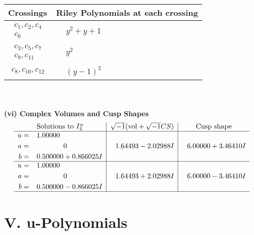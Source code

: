 \documentclass[1p]{elsarticle_modified}
\theoremstyle{definition}
\newcommand{\I}{\sqrt{-1}}
\begin{document}
\begin{tabular}{m{50pt}|m{274pt}}
Crossings & \hspace{64pt}Riley Polynomials at each crossing \\
\hline $$\begin{aligned}c_{1},c_{2},c_{4}\\c_{6}\end{aligned}$$&$\begin{aligned}
&y^2+y+1
\end{aligned}$\\
\hline $$\begin{aligned}c_{3},c_{5},c_{7}\\c_{9},c_{11}\end{aligned}$$&$\begin{aligned}
&y^2
\end{aligned}$\\
\hline $$\begin{aligned}c_{8},c_{10},c_{12}\end{aligned}$$&$\begin{aligned}
&(y-1)^2
\end{aligned}$\\
\hline
\end{tabular}\\~\\
\newpage\flushleft \textbf{(vi) Complex Volumes and Cusp Shapes}
$$\begin{array}{c|c|c}  
\text{Solutions to }I^u_{4}& \I (\text{vol} + \sqrt{-1}CS) & \text{Cusp shape}\\
 \hline 
\begin{aligned}
u &= \phantom{-}1.00000\phantom{ +0.000000I} \\
a &= \phantom{-0.000000 } 0 \\
b &= \phantom{-}0.500000 + 0.866025 I\end{aligned}
 & \phantom{-}1.64493 - 2.02988 I & \phantom{-}6.00000 + 3.46410 I \\ \hline\begin{aligned}
u &= \phantom{-}1.00000\phantom{ +0.000000I} \\
a &= \phantom{-0.000000 } 0 \\
b &= \phantom{-}0.500000 - 0.866025 I\end{aligned}
 & \phantom{-}1.64493 + 2.02988 I & \phantom{-}6.00000 - 3.46410 I\\
 \hline 
 \end{array}$$\newpage
\newpage\renewcommand{\arraystretch}{1}
\centering \section*{ V. u-Polynomials}
\end{document}
